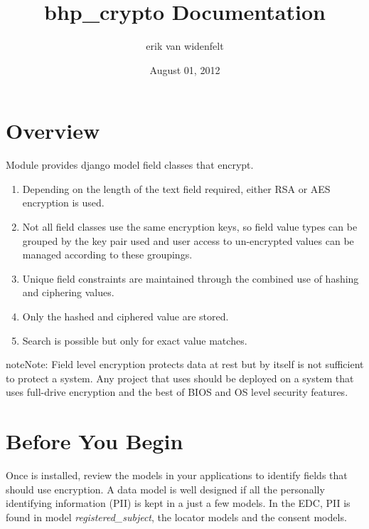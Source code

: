 \documentclass[letterpaper,10pt,english]{sphinxmanual}
\title{bhp\_crypto Documentation}
\date{August 01, 2012}
\author{erik van widenfelt}
\begin{document}
\maketitle
\tableofcontents
{}\label{index::doc}



\chapter{Overview}
\label{overview:overview}\label{overview::doc}\label{overview:bhp-crypto}
Module  provides django model field classes that encrypt.
\begin{enumerate}
\item {} 
Depending on the length of the text field required, either RSA or AES encryption is used.

\item {} 
Not all field classes use the same encryption keys, so field value types can be
grouped by the key pair used and user access to un-encrypted values can be managed
according to these groupings.

\item {} 
Unique field constraints are maintained through the combined use of hashing and
ciphering values.

\item {} 
Only the hashed and ciphered value are stored.

\item {} 
Search is possible but only for exact value matches.

\end{enumerate}

\begin{notice}{note}{Note:}
Field level encryption protects data at rest but by itself is not
sufficient to protect a system. Any project that uses 
should be deployed on a system that uses full-drive encryption and the
best of BIOS and OS level security features.
\end{notice}


\chapter{Before You Begin}
\label{before_you_begin::doc}\label{before_you_begin:before-you-begin}
Once  is installed, review the models in your applications to identify fields that should use encryption.
A data model is well designed if all the personally identifying information (PII) is kept in a just a few models. In the
EDC, PII is found in model \emph{registered\_subject}, the locator models and the consent models.
\end{document}
